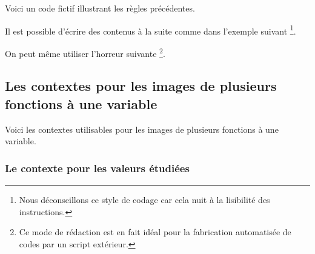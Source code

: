 

\medskip


Voici un code fictif illustrant les règles précédentes.



Il est possible d'écrire des contenus à la suite comme dans l'exemple suivant
\footnote{
    Nous déconseillons ce style de codage car cela nuit à la lisibilité des instructions.
}.



On peut même utiliser l'horreur suivante
\footnote{
    Ce mode de rédaction est en fait idéal pour la fabrication automatisée de codes par un script extérieur.
}.




\subsection{Les contextes pour les images de plusieurs fonctions à une variable}

Voici les contextes utilisables pour les images de plusieurs fonctions à une variable.

\medskip

\begin{itemize*}[before = \leavevmode\kern15pt, itemjoin = \kern15pt]
	\item {}

	\item {}
\end{itemize*}



\subsubsection{Le contexte  pour les valeurs étudiées}
\label{tns-math-functab-dsl-l3-ctxt-xvals}

